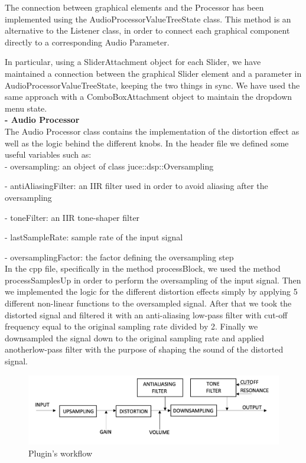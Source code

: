 \documentclass[letterpaper, 12pt]{article}
\begin{document}
	The connection between graphical elements and the Processor has been implemented using the AudioProcessorValueTreeState class. This method is an alternative to the Listener class, in order to connect each graphical component directly to a corresponding Audio Parameter.
	
	In particular, using  a SliderAttachment object for each Slider, we have maintained a connection between the graphical Slider element and a parameter in AudioProcessorValueTreeState, keeping the two things in sync. We have used the same approach with a ComboBoxAttachment object to maintain the dropdown menu state.
	\\
	
	\textbf{-	Audio Processor }\\
	
	The Audio Processor class contains the implementation of the distortion effect as well as the logic behind the different knobs.
	In the header file we defined some useful variables such as:
	\\
	
	-	oversampling: an object of class juce::dsp::Oversampling
	
	-	antiAliasingFilter: an IIR filter used in order to avoid aliasing after the oversampling
	
	-	toneFilter: an IIR tone-shaper filter
	
	-	lastSampleRate: sample rate of the input signal
	
	-	oversamplingFactor: the factor defining the oversampling step
	\\
	
	In the cpp file, specifically in the method processBlock, we used the method processSamplesUp in order to perform the oversampling of the input signal.
	Then we implemented the logic for the different distortion effects simply by applying 5 different non-linear functions to the oversampled signal.
	After that we took the distorted signal and filtered it with an anti-aliasing low-pass filter with cut-off frequency equal to the original sampling rate divided by 2.
	Finally we downsampled the signal down to the original sampling rate and applied anotherlow-pass filter with the purpose of shaping the sound of the distorted signal.  
	
	\begin{figure}[h!]
		\includegraphics[scale=0.5]{workflow.png}
		\centering
		\caption{Plugin's workflow}
		\label{fig:workflow}
	\end{figure}
	
	\begin{thebibliography}{99}
		
	\end{thebibliography}
	
	
\end{document}
